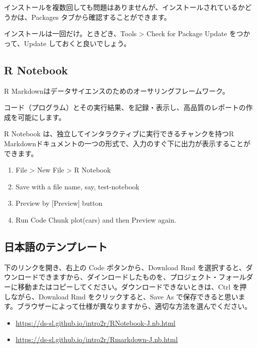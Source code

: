\documentclass[
]{bxjsbook}
\providecommand{\tightlist}{%
  \setlength{\itemsep}{0pt}\setlength{\parskip}{0pt}}
\theoremstyle{definition}
\theoremstyle{definition}
\theoremstyle{definition}
\theoremstyle{definition}
\theoremstyle{remark}
\begin{document}
インストールを複数回しても問題はありませんが、インストールされているかどうかは、Packages タブから確認することができます。

インストールは一回だけ。ときどき、Tools \textgreater{} Check for Package Update をつかって、Update しておくと良いでしょう。

\hypertarget{r-notebook}{%
\subsection{R Notebook}\label{r-notebook}}

R Markdownはデータサイエンスのためのオーサリングフレームワーク。

コード（プログラム）とその実行結果、を記録・表示し、高品質のレポートの作成を可能にします。

R Notebook は、独立してインタラクティブに実行できるチャンクを持つR Markdownドキュメントの一つの形式で、入力のすぐ下に出力が表示することができます。

\begin{enumerate}
\def\labelenumi{\arabic{enumi}.}
\tightlist
\item
  File \textgreater{} New File \textgreater{} R Notebook
\item
  Save with a file name, say, test-notebook
\item
  Preview by {[}Preview{]} button
\item
  Run Code Chunk plot(cars) and then Preview again.
\end{enumerate}

\hypertarget{ux65e5ux672cux8a9eux306eux30c6ux30f3ux30d7ux30ecux30fcux30c8}{%
\subsection{日本語のテンプレート}\label{ux65e5ux672cux8a9eux306eux30c6ux30f3ux30d7ux30ecux30fcux30c8}}

下のリンクを開き、右上の Code ボタンから、Download Rmd を選択すると、ダウンロードできますから、ダインロードしたものを、プロジェクト・フォールダーに移動またはコピーしてください。ダウンロードできないときは、Ctrl を押しながら、Download Rmd をクリックすると、Save As で保存できると思います。ブラウザーによって仕様が異なりますから、適切な方法を選んでください。

\begin{itemize}
\tightlist
\item
  \url{https://ds-sl.github.io/intro2r/RNotebook-J.nb.html}
\item
  \url{https://ds-sl.github.io/intro2r/Rmarkdown-J.nb.html}
\end{itemize}
\end{document}
